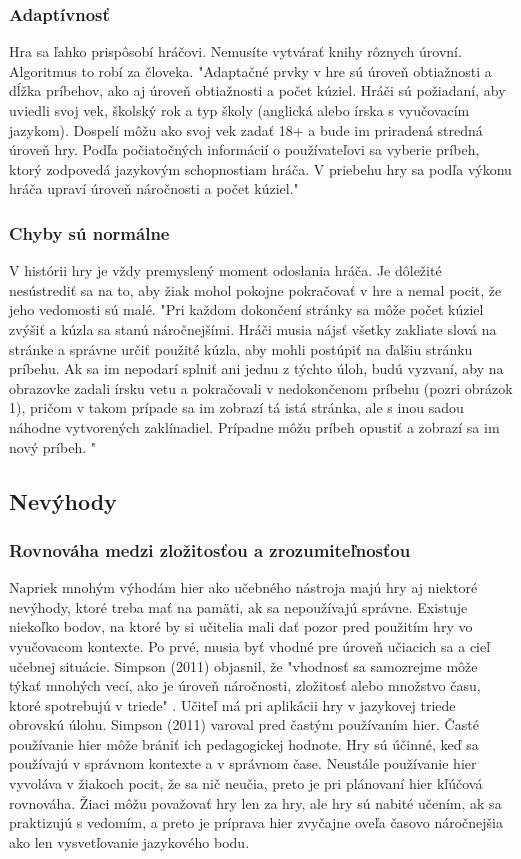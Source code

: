 \documentclass[10pt,twoside,slovak,a4paper]{article}
\begin{document}
\subsubsection{Adaptívnosť}
\qquad Hra sa ľahko prispôsobí hráčovi. Nemusíte vytvárať knihy rôznych úrovní. Algoritmus to robí za človeka. "Adaptačné prvky v hre sú úroveň obtiažnosti a dĺžka príbehov, ako aj úroveň obtiažnosti a počet kúziel. Hráči sú požiadaní, aby uviedli svoj vek, školský rok a typ školy (anglická alebo írska s vyučovacím jazykom). Dospelí môžu ako svoj vek zadať 18+ a bude im priradená stredná úroveň hry. Podľa počiatočných informácií o používateľovi sa vyberie príbeh, ktorý zodpovedá jazykovým schopnostiam hráča. V priebehu hry sa podľa výkonu hráča upraví úroveň náročnosti a počet kúziel." \cite{Xu2022Jun}\\
\subsubsection{Chyby sú normálne}
\qquad V histórii hry je vždy premyslený moment odoslania hráča. Je dôležité nesústrediť sa na to, aby žiak mohol pokojne pokračovať v hre a nemal pocit, že jeho vedomosti sú malé. "Pri každom dokončení stránky sa môže počet kúziel zvýšiť a kúzla sa stanú náročnejšími. Hráči musia nájsť všetky zakliate slová na stránke a správne určiť použité kúzla, aby mohli postúpiť na ďalšiu stránku príbehu. Ak sa im nepodarí splniť ani jednu z týchto úloh, budú vyzvaní, aby na obrazovke zadali írsku vetu a pokračovali v nedokončenom príbehu (pozri obrázok 1), pričom v takom prípade sa im zobrazí tá istá stránka, ale s inou sadou náhodne vytvorených zaklínadiel. Prípadne môžu príbeh opustiť a zobrazí sa im nový príbeh. "\cite{Xu2022Jun}\\
\subsection{Nevýhody} 
\subsubsection{Rovnováha medzi zložitosťou a zrozumiteľnosťou}
\qquad Napriek mnohým výhodám hier ako učebného nástroja majú hry aj niektoré nevýhody, ktoré treba mať na pamäti, ak sa nepoužívajú správne. Existuje niekoľko bodov, na ktoré by si učitelia mali dať pozor pred použitím hry vo vyučovacom kontexte. Po prvé, musia byť vhodné pre úroveň učiacich sa a cieľ učebnej situácie. Simpson (2011)\cite{BibEntry2022Apr} objasnil, že "vhodnosť sa samozrejme môže týkať mnohých vecí, ako je úroveň náročnosti, zložitosť alebo množstvo času, ktoré spotrebujú v triede" .  Učiteľ má pri aplikácii hry v jazykovej triede obrovskú úlohu. Simpson (2011)\cite{BibEntry2022Apr} varoval pred častým používaním hier. Časté používanie hier môže brániť ich pedagogickej hodnote. Hry sú účinné, keď sa používajú v správnom kontexte a v správnom čase. Neustále používanie hier vyvoláva v žiakoch pocit, že sa nič neučia, preto je pri plánovaní hier kľúčová rovnováha. Žiaci môžu považovať hry len za hry, ale hry sú nabité učením, ak sa praktizujú s vedomím, a preto je príprava hier zvyčajne oveľa časovo náročnejšia ako len vysvetľovanie jazykového bodu.\cite{Akkaya2016Oct}\\
\end{document}
